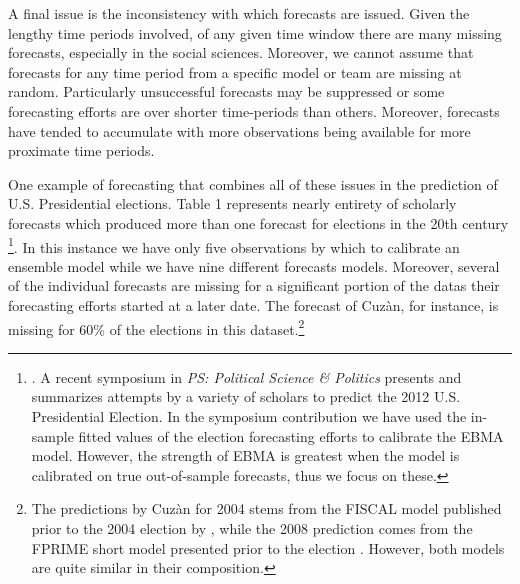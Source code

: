 \documentclass[12pt,fullpage,endnotes]{article}
\begin{document}
A final issue is the inconsistency with which forecasts are
issued. Given the lengthy time periods involved, of any given time
window there are many missing forecasts, especially in the social sciences.  Moreover, we cannot assume
that forecasts for any time period from a specific model or team are
missing at random.  Particularly unsuccessful forecasts may be
suppressed or some forecasting efforts are over shorter time-periods than others. Moreover, forecasts have tended to accumulate with more
observations being available for more proximate time periods.

One example of forecasting that combines all of these issues in the
prediction of U.S. Presidential elections.  Table 1 represents nearly
entirety of scholarly forecasts which produced more than one forecast
for elections in the 20th century \footnote{
\cite[See, for example]{Fair:2009,Fair2011,Abramowitz:2008,Campbell:2008,Cuzan:2004,Cuzan:Bundrick:2008,hibbs:2012,Lockerbie:2008,Erikson:Wlezien:2008,Graefe:2010,Holbrook:2008}.
A recent symposium in {\em PS: Political Science \& Politics} presents and summarizes attempts by a variety of scholars to predict the 2012 U.S. Presidential Election. In the symposium contribution we have used the in-sample fitted values of the election forecasting efforts to calibrate the EBMA model. However, the strength of EBMA is greatest when the model is calibrated on true out-of-sample forecasts, thus we focus on these.}.  In this instance
we have only five observations by which to calibrate an ensemble model while we
have nine different forecasts models.  Moreover, several of the individual forecasts
are missing for a significant portion of the datas their forecasting efforts started at a later date. The forecast of
Cuz\`an, for instance, is missing for 60\% of the elections in this
dataset.\footnote{The predictions by Cuz\`an for 2004 stems from the FISCAL model published prior to the 2004 election by \citet{Cuzan:2004}, while the 2008 prediction comes from the FPRIME short model presented prior to the election \citep{Cuzan:Bundrick:2008}. However, both models are quite similar in their composition.} 
\end{document}
